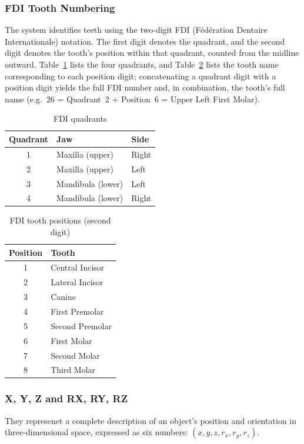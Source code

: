 \subsubsection{FDI Tooth Numbering}
\label{sec:fdi}
The system identifies teeth using the two-digit FDI (F\'ed\'eration Dentaire Internationale) notation. The first digit denotes the quadrant, and the second digit denotes the tooth's position within that quadrant, counted from the midline outward. Table~\ref{tab:fdi-quadrants} lists the four quadrants, and Table~\ref{tab:fdi-positions} lists the tooth name corresponding to each position digit; concatenating a quadrant digit with a position digit yields the full FDI number and, in combination, the tooth's full name (e.g.\ $26$ = Quadrant~2 + Position~6 = Upper Left First Molar).

\begin{table}[h]
\centering
\caption{FDI quadrants}
\label{tab:fdi-quadrants}
\begin{tabular}{cll}
\toprule
Quadrant & Jaw & Side \\
\midrule
1 & Maxilla (upper) & Right \\
2 & Maxilla (upper) & Left \\
3 & Mandibula (lower) & Left \\
4 & Mandibula (lower) & Right \\
\bottomrule
\end{tabular}
\end{table}

\begin{table}[h]
\centering
\caption{FDI tooth positions (second digit)}
\label{tab:fdi-positions}
\begin{tabular}{cl}
\toprule
Position & Tooth \\
\midrule
1 & Central Incisor \\
2 & Lateral Incisor \\
3 & Canine \\
4 & First Premolar \\
5 & Second Premolar \\
6 & First Molar \\
7 & Second Molar \\
8 & Third Molar \\
\bottomrule
\end{tabular}
\end{table}

\subsubsection{X, Y, Z and RX, RY, RZ}
They represenet a complete description of an object's position and orientation in three-dimensional space, expressed as six numbers: $(x, y, z, r_x, r_y, r_z)$.

